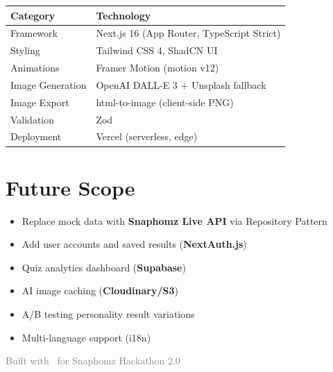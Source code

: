 \documentclass[11pt,a4paper]{article}
\begin{document}
\begin{table}[h]
\centering
\begin{tabular}{@{}ll@{}}
\toprule
\textbf{Category} & \textbf{Technology} \\
\midrule
Framework & Next.js 16 (App Router, TypeScript Strict) \\
Styling & Tailwind CSS 4, ShadCN UI \\
Animations & Framer Motion (motion v12) \\
Image Generation & OpenAI DALL-E 3 + Unsplash fallback \\
Image Export & html-to-image (client-side PNG) \\
Validation & Zod \\
Deployment & Vercel (serverless, edge) \\
\bottomrule
\end{tabular}
\end{table}

\section{Future Scope}

\begin{itemize}[nosep]
    \item Replace mock data with \textbf{Snaphomz Live API} via Repository Pattern
    \item Add user accounts and saved results (\textbf{NextAuth.js})
    \item Quiz analytics dashboard (\textbf{Supabase})
    \item AI image caching (\textbf{Cloudinary/S3})
    \item A/B testing personality result variations
    \item Multi-language support (i18n)
\end{itemize}

\vfill
\begin{center}
\small\textcolor{gray}{Built with \heartsuit\ for Snaphomz Hackathon 2.0}
\end{center}
\end{document}
